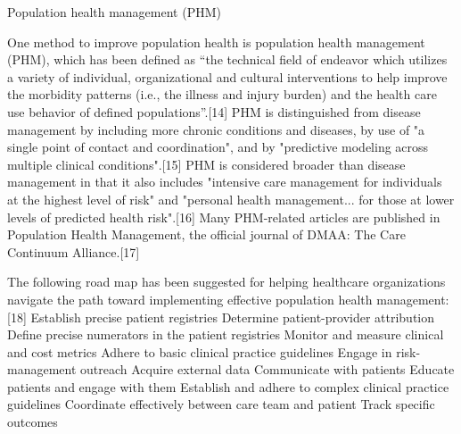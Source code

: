 Population health management (PHM)
 
One method to improve population health is population health management (PHM), which has been defined as “the technical field of endeavor which utilizes a variety of individual, organizational and cultural interventions to help improve the morbidity patterns (i.e., the illness and injury burden) and the health care use behavior of defined populations”.[14] PHM is distinguished from disease management by including more chronic conditions and diseases, by use of "a single point of contact and coordination", and by "predictive modeling across multiple clinical conditions".[15] PHM is considered broader than disease management in that it also includes "intensive care management for individuals at the highest level of risk" and "personal health management... for those at lower levels of predicted health risk".[16] Many PHM-related articles are published in Population Health Management, the official journal of DMAA: The Care Continuum Alliance.[17]
 
The following road map has been suggested for helping healthcare organizations navigate the path toward implementing effective population health management:[18]
 Establish precise patient registries
 Determine patient-provider attribution
 Define precise numerators in the patient registries
 Monitor and measure clinical and cost metrics
 Adhere to basic clinical practice guidelines
 Engage in risk-management outreach
 Acquire external data
 Communicate with patients
 Educate patients and engage with them
 Establish and adhere to complex clinical practice guidelines
 Coordinate effectively between care team and patient
 Track specific outcomes
